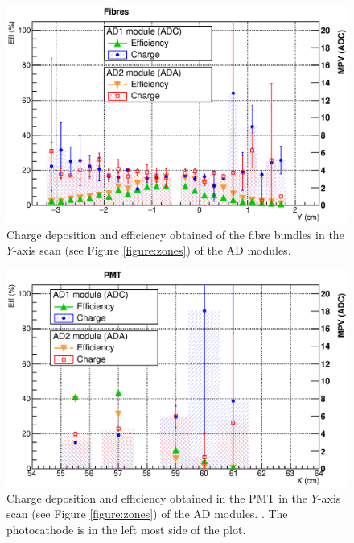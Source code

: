 	\begin{figure}[ht!]
		\begin{center}
			\includegraphics[scale=0.5]{./images/scan/Fiber_scan.eps}
			\caption{
			Charge deposition and efficiency obtained of the fibre bundles in the $Y$-axis scan	
			(see Figure \ref{figure:zones}) of the AD modules. 
			}
			\label{figure:ScanFib}
		\end{center}
	\end{figure}
	
	\begin{figure}[h!]
	\begin{center}
	  \includegraphics[scale=0.5]{./images/scan/PMT_scan.eps}
	  \caption{
	  Charge deposition and efficiency obtained  in the PMT in the $Y$-axis scan (see Figure \ref{figure:zones}) of the AD modules. . The photocathode is in the left most side of the plot.
	  }
	  \label{figure:scanPMT}
	\end{center}
	\end{figure}

